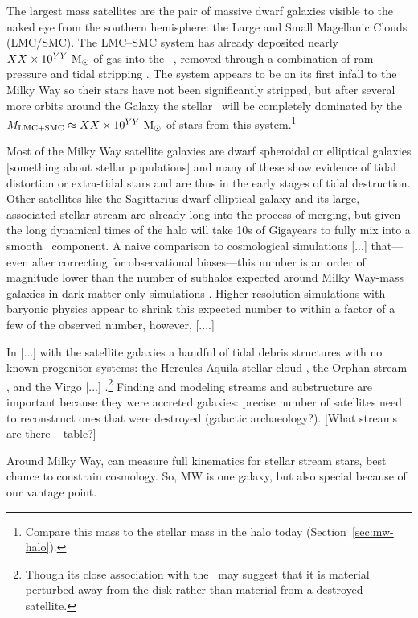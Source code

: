The largest mass satellites are the pair of massive dwarf galaxies visible to the naked eye from the southern hemisphere: the Large and Small Magellanic Clouds (LMC/SMC). The LMC--SMC system has already deposited nearly $XX \times 10^{YY}~\mathrm{M}_\odot$ of gas into the \mwhalo\ \citep{putman-todo}, removed through a combination of ram-pressure and tidal stripping \citep{salem-todo}. The system appears to be on its first infall to the Milky Way \citep{besla10} so their stars have not been significantly stripped, but after several more orbits around the Galaxy the stellar \mwhalo\ will be completely dominated by the $M_{\rm LMC+SMC} \approx XX \times 10^{YY}~\mathrm{M}_\odot$ of stars from this system.\footnote{Compare this mass to the stellar mass in the halo today (Section~\ref{sec:mw-halo}).} 

Most of the Milky Way satellite galaxies are dwarf spheroidal or elliptical galaxies [something about stellar populations] and many of these show evidence of tidal distortion or extra-tidal stars \citep[e.g.,][]{todo-hercules, todo} and are thus in the early stages of tidal destruction. Other satellites like the Sagittarius dwarf elliptical galaxy and its large, associated stellar stream are already long into the process of merging, but given the long dynamical times of the halo will take 10s of Gigayears to fully mix into a smooth \mwhalo\ component. A naive comparison to cosmological simulations [...] that---even after correcting for observational biases---this number is an order of magnitude lower than the number of subhalos expected around Milky Way-mass galaxies in dark-matter-only simulations \citep[$\sim$1000;][]{missing-satellites-todo}. Higher resolution simulations with baryonic physics appear to shrink this expected number to within a factor of a few of the observed number, however, [....]

In [...] with the satellite galaxies a handful of tidal debris structures with no known progenitor systems: the Hercules-Aquila stellar cloud \citep{todo}, the Orphan stream \citep{newberg02}, and the Virgo [...] \citep{todo}.\footnote{Though its close association with the \mwdisk\ may suggest that it is material perturbed away from the disk rather than material from a destroyed satellite.} Finding and modeling streams and substructure are important because they were accreted galaxies: precise number of satellites need to reconstruct ones that were destroyed (galactic archaeology?). [What streams are there -- table?]

Around Milky Way, can measure full kinematics for stellar stream stars, best chance to constrain cosmology. So, MW is one galaxy, but also special because of our vantage point.

